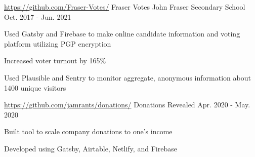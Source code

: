 

\begin{cventries}

  \cventry
    {\url{https://github.com/Fraser-Votes/}} %
    {Fraser Votes} %
    {John Fraser Secondary School} %
    {Oct. 2017 - Jun. 2021} %
    {
      \begin{cvitems} %
		\item {Used Gatsby and Firebase to make online candidate information and voting platform utilizing PGP encryption}
		\item {Increased voter turnout by 165\%}
		\item {Used Plausible and Sentry to monitor aggregate, anonymous information about 1400 unique visitors}
      \end{cvitems}
    }

  \cventry
    {\url{https://github.com/jamrants/donations/}} %
    {Donations Revealed} %
    {} %
    {Apr. 2020 - May. 2020} %
    {
      \begin{cvitems} %
        \item Built tool to scale company donations to one's income
        \item Developed using Gatsby, Airtable, Netlify, and Firebase
      \end{cvitems}
    }

\end{cventries}
